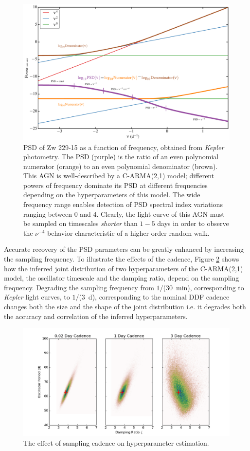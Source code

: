 \begin{figure}
\includegraphics[width=5.0in]{figs/agn/AGN_Variability_01.pdf}
\caption{PSD of Zw 229-15 as a function of frequency, obtained from {\em Kepler}
photometry. The PSD (purple) is the ratio of an even polynomial numerator (orange)
to an even polynomial denominator (brown). This AGN is well-described by a
C-ARMA(2,1) model; different powers of frequency dominate its PSD at different
frequencies depending on the hyperparameters of this model. The wide
frequency range enables detection of PSD spectral index variations ranging
between 0 and 4. Clearly, the light curve of this AGN must be sampled on
timescales {\em shorter} than $1-5$ days in order to observe the $\nu^{-4}$
behavior characteristic of a higher order random walk.
}
\label{PSDvsFreq}
\end{figure}

Accurate recovery of the PSD parameters can be greatly enhanced by increasing the
sampling frequency. To illustrate the effects of the cadence, Figure \ref{CadenceEffect}
shows how the inferred joint distribution of two hyperparameters of the C-ARMA(2,1) model, the 
oscillator timescale and the damping ratio, depend on the sampling frequency. Degrading the
sampling frequency from $1/$($30$~min), corresponding to {\em Kepler} light curves, to $1/$($3$~d),
corresponding to the nominal DDF cadence
changes both the size and the shape of the joint distribution i.e. it degrades both 
the accuracy and correlation of the inferred hyperparameters. 

\begin{figure}
\includegraphics[width=5.0in]{figs/agn/AGN_Variability_00.png}
\caption{The effect of sampling cadence on hyperparameter estimation.}
\label{CadenceEffect}
\end{figure}

